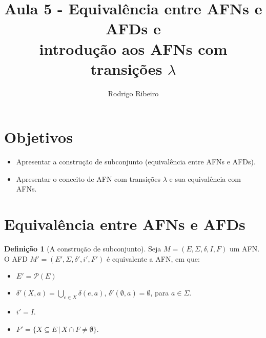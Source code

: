\documentclass[a4paper]{article}
\theoremstyle{definition}
\newtheorem{Definition}{Definição}
\begin{document}
  \title{Aula 5 - Equivalência entre AFNs e AFDs e\\ introdução aos AFNs com
    transições $\lambda$}
  \author{Rodrigo Ribeiro}

  \maketitle


  \pagestyle{fancy}


  \section*{Objetivos}

  \begin{itemize}
     \item Apresentar a construção de subconjunto (equivalência entre AFNs e AFDs). 
     \item Apresentar o conceito de AFN com transições $\lambda$ e sua
       equivalência com AFNs.
  \end{itemize}

  \section{Equivalência entre AFNs e AFDs}

  \begin{Definition}[A construção de subconjunto]\label{subset}
    Seja $M = (E,\Sigma,\delta,I,F)$ um AFN. O AFD
    $M' = (E',\Sigma,\delta',i',F')$ é equivalente
    a AFN, em que:
    \begin{itemize}
       \item $E' = \mathcal{P}(E)$
       \item $\delta'(X,a) = \bigcup_{e\in X}\delta(e,a)$, $\delta'(\emptyset,a)
         = \emptyset$, para $a\in \Sigma$.
       \item $i' = I$.
       \item $F' = \{X \subseteq E\,|\, X \cap F \neq \emptyset\}$.
    \end{itemize}
  \end{Definition}
\end{document}
